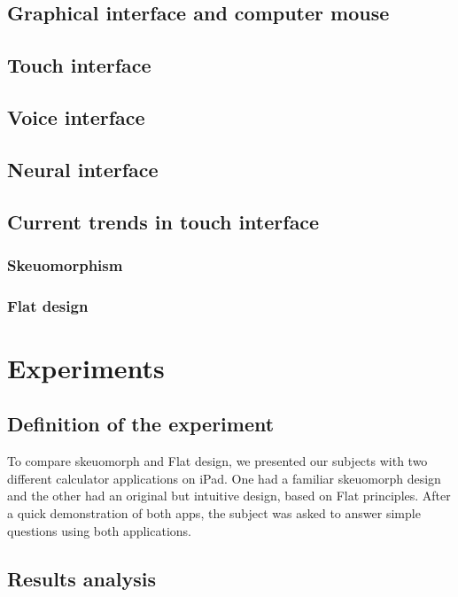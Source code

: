 \documentclass[a4paper,11pt] {article}
\theoremstyle{definition}
\begin{document}
    \subsection{Graphical interface and computer mouse}
    \subsection{Touch interface}
    \subsection{Voice interface}
    \subsection{Neural interface}
    \subsection{Current trends in touch interface}
        \subsubsection{Skeuomorphism}
        \subsubsection{Flat design}


\section{Experiments}
\label{sct:experiment}

    \subsection{Definition of the experiment}

    To compare skeuomorph and Flat design, we presented our subjects with two different calculator applications on iPad. One had a familiar skeuomorph design and the other had an original but intuitive design, based on Flat principles. After a quick demonstration of both apps, the subject was asked to answer simple questions using both applications.\\


    \subsection{Results analysis}
\end{document}
